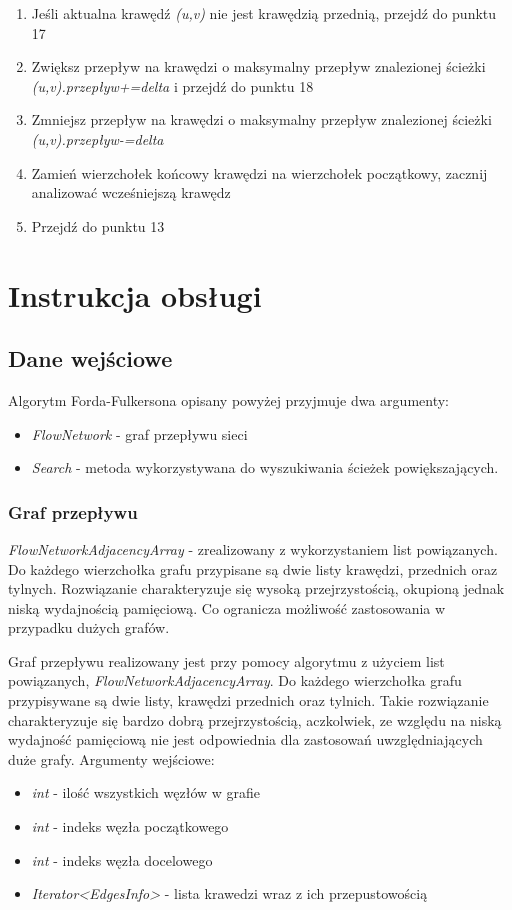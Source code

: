 \documentclass[10pt]{dokument-tiwo}
\begin{document}
\begin{enumerate}
\item{Jeśli aktualna krawędź \emph{(u,v)} nie jest krawędzią przednią, przejdź do punktu 17}
\item{Zwiększ przepływ na krawędzi o maksymalny przepływ znalezionej ścieżki \emph{(u,v).przepływ+=delta} i przejdź do punktu 18}
\item{Zmniejsz przepływ na krawędzi o maksymalny przepływ znalezionej ścieżki \emph{(u,v).przepływ-=delta}}
\item{Zamień wierzchołek końcowy krawędzi na wierzchołek początkowy, zacznij analizować wcześniejszą krawędz}
\item{Przejdź do punktu 13}
\end{enumerate}


\section{Instrukcja obsługi}
\subsection{Dane wejściowe}
Algorytm Forda-Fulkersona opisany powyżej przyjmuje dwa argumenty:
\begin{itemize}
  \item \emph{FlowNetwork} - graf przepływu sieci
  \item \emph{Search} - metoda wykorzystywana do wyszukiwania ścieżek powiększających.
\end{itemize}

\subsubsection{Graf przepływu}
\emph{FlowNetworkAdjacencyArray} - zrealizowany z wykorzystaniem list powiązanych. Do każdego wierzchołka grafu przypisane są dwie listy krawędzi, przednich oraz tylnych. Rozwiązanie charakteryzuje się wysoką przejrzystością, okupioną jednak niską
wydajnością pamięciową. Co ogranicza możliwość zastosowania w przypadku dużych grafów.

Graf przepływu realizowany jest przy pomocy algorytmu z użyciem list powiązanych, \emph{FlowNetworkAdjacencyArray}. Do każdego wierzchołka grafu przypisywane są dwie listy,
krawędzi przednich oraz tylnich. Takie rozwiązanie charakteryzuje się bardzo dobrą przejrzystością, aczkolwiek, ze względu na niską wydajność pamięciową nie jest odpowiednia dla zastosowań uwzględniających duże grafy.
Argumenty wejściowe:
\begin{itemize}
  \item \emph{int} - ilość wszystkich węzłów w grafie
  \item \emph{int} - indeks węzła początkowego
  \item \emph{int} - indeks węzła docelowego
  \item \emph{Iterator<EdgesInfo>} - lista krawedzi wraz z ich przepustowością
\end{itemize}
\end{document}
